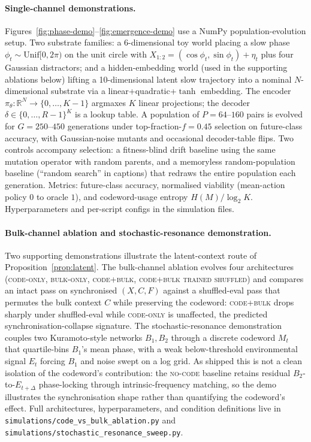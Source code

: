 \documentclass[12pt]{article}
\theoremstyle{definition}
\newcommand{\R}{\mathbb{R}}
\begin{document}
\paragraph{Single-channel demonstrations.} Figures~\ref{fig:phase-demo}--\ref{fig:emergence-demo} use a NumPy population-evolution setup. Two substrate families: a 6-dimensional toy world placing a slow phase $\phi_t\sim\mathrm{Unif}[0,2\pi)$ on the unit circle with $X_{1:2}=(\cos\phi_t,\sin\phi_t)+\eta_t$ plus four Gaussian distractors; and a hidden-embedding world (used in the supporting ablations below) lifting a 10-dimensional latent slow trajectory into a nominal $N$-dimensional substrate via a linear+quadratic+$\tanh$ embedding. The encoder $\pi_\theta:\R^N\to\{0,\ldots,K-1\}$ argmaxes $K$ linear projections; the decoder $\delta\in\{0,\ldots,R-1\}^K$ is a lookup table. A population of $P{=}64$--$160$ pairs is evolved for $G{=}250$--$450$ generations under top-fraction-$f{=}0.45$ selection on future-class accuracy, with Gaussian-noise mutants and occasional decoder-table flips. Two controls accompany selection: a fitness-blind drift baseline using the same mutation operator with random parents, and a memoryless random-population baseline (``random search'' in captions) that redraws the entire population each generation. Metrics: future-class accuracy, normalised viability (mean-action policy $0$ to oracle $1$), and codeword-usage entropy $H(M)/\log_2 K$. Hyperparameters and per-script configs in the simulation files.

\paragraph{Bulk-channel ablation and stochastic-resonance demonstration.} Two supporting demonstrations illustrate the latent-context route of Proposition~\ref{prop:latent}. The bulk-channel ablation evolves four architectures (\textsc{code-only}, \textsc{bulk-only}, \textsc{code+bulk}, \textsc{code+bulk trained shuffled}) and compares an intact pass on synchronised $(X,C,F)$ against a shuffled-eval pass that permutes the bulk context $C$ while preserving the codeword: \textsc{code+bulk} drops sharply under shuffled-eval while \textsc{code-only} is unaffected, the predicted synchronisation-collapse signature. The stochastic-resonance demonstration couples two Kuramoto-style networks $B_1,B_2$ through a discrete codeword $M_t$ that quartile-bins $B_1$'s mean phase, with a weak below-threshold environmental signal $E_t$ forcing $B_1$ and noise swept on a log grid. As shipped this is not a clean isolation of the codeword's contribution: the \textsc{no-code} baseline retains residual $B_2$-to-$E_{t+\Delta}$ phase-locking through intrinsic-frequency matching, so the demo illustrates the synchronisation shape rather than quantifying the codeword's effect. Full architectures, hyperparameters, and condition definitions live in \texttt{simulations/code\_vs\_bulk\_ablation.py} and \texttt{simulations/stochastic\_resonance\_sweep.py}.
\end{document}

